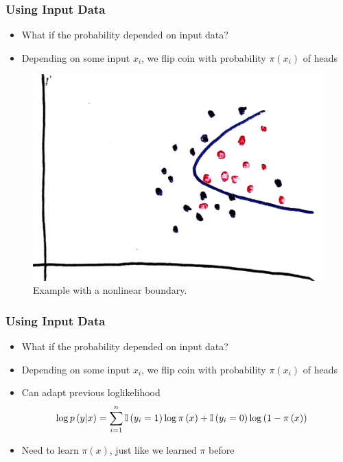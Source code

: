 \documentclass[10pt,mathserif]{beamer}
\begin{document}
\begin{frame}
  \frametitle{Using Input Data}
  \begin{itemize}
  \item What if the probability depended on input data?
  \item Depending on some input $x_i$, we flip coin with probability
    $\pi\left(x_i\right)$ of heads
  \end{itemize}
  \begin{figure}
    \centering
    \includegraphics[width=0.3\paperwidth]{figure/logistic_scatter_nonlinear}
    \caption{Example with a nonlinear
      boundary. \label{fig:logistic_nonlinear_scatter_points} }
  \end{figure}
\end{frame}

\begin{frame}
  \frametitle{Using Input Data}
  \begin{itemize}
  \item What if the probability depended on input data?
  \item Depending on some input $x_i$, we flip coin with probability
    $\pi\left(x_i\right)$ of heads
  \item Can adapt previous loglikelihood
    \begin{align*}
      \log p\left(y \vert x\right) &= \sum_{i = 1}^{n} \mathbb{I}\left({y_i = 1}\right)\log \pi\left(x\right) + \mathbb{I}\left({y_i = 0}\right)\log\left(1 - \pi\left(x\right)\right)
    \end{align*}
  \item Need to learn $\pi\left(x\right)$, just like we learned $\pi$ before
  \end{itemize}
\end{frame}
\end{document}
